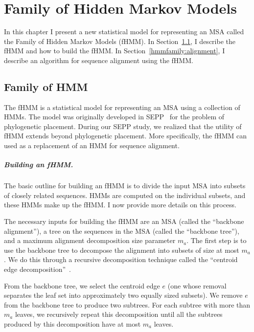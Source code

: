 \chapter{Family of Hidden Markov Models}
\label{hmmfamily}

In this chapter I present a new statistical model for representing an MSA called the Family of Hidden Markov Models (fHMM).  In Section~\ref{hmmfamily:model}, I describe the fHMM and how to build the fHMM.  In Section~\ref{hmmfamily:alignment}, I describe an algorithm for sequence alignment using the fHMM.  

\section{Family of HMM}\label{hmmfamily:model}
The fHMM is a statistical model for representing an MSA using a collection of HMMs.  The model was originally developed in SEPP~\cite{Mirarab2012} for the problem of phylogenetic placement.  During our SEPP study, we realized that the utility of fHMM extends beyond phylogenetic placement.  More specifically, the fHMM can used as a replacement of an HMM for sequence alignment.  

\paragraph{Building an fHMM.}  The basic outline for building an fHMM is to divide the input MSA into subsets of closely related sequences.  HMMs are computed on the individual subsets, and these HMMs make up the fHMM.  I now provide more details on this process.  

The necessary inputs for building the fHMM are an MSA (called the ``backbone alignment''), a tree on the sequences in the MSA (called the ``backbone tree''), and a maximum alignment decomposition size parameter $m_a$.  The first step is to use the backbone tree to decompose the alignment into subsets of size at most $m_a$.  We do this through a recursive decomposition technique called the ``centroid edge decomposition''~\cite{Liu2012}.

From the backbone tree, we select the centroid edge $e$ (one whose removal separates the leaf set into approximately two equally sized subsets).  We remove $e$ from the backbone tree to produce two subtrees.  For each subtree with more than $m_a$ leaves, we recursively repeat this decomposition until all the subtrees produced by this decomposition have at most $m_a$ leaves.  

